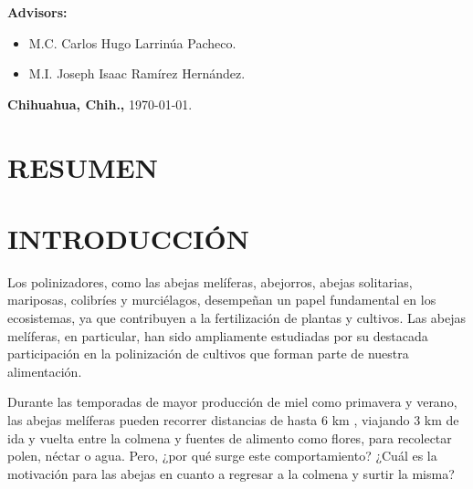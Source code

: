 \documentclass[12pt]{report}
\begin{document}
\begin{titlepage}
\begin{center}
			{\large \textbf{Advisors:}}\\[3.5ex]
			\begin{itemize}
				\item[\ding{226}] {\large M.C. Carlos Hugo Larrinúa Pacheco.}\\[3.5ex]
				\item[\ding{226}] {\large M.I. Joseph Isaac Ramírez Hernández.}\\[3.5ex]
			\end{itemize}
			\vfill
			{\large \textbf{Chihuahua, Chih.,} \today.}\\[3.5ex]
		\end{center}
	\end{titlepage}

\tableofcontents
\thispagestyle{empty} %


\pagebreak
\chapter*{RESUMEN}

\pagebreak
\chapter{INTRODUCCIÓN}

Los polinizadores, como las abejas melíferas, abejorros, abejas solitarias, mariposas, colibríes y murciélagos, desempeñan un papel fundamental en los ecosistemas, ya que contribuyen a la fertilización de plantas y cultivos. Las abejas melíferas, en particular, han sido ampliamente estudiadas por su destacada participación en la polinización de cultivos que forman parte de nuestra alimentación.

\par Durante las temporadas de mayor producción de miel como primavera y verano, las abejas melíferas pueden recorrer distancias de hasta 6 km \cite{Beekman2000}, viajando 3 km de ida y vuelta entre la colmena y fuentes de alimento como flores, para recolectar polen, néctar o agua. Pero, ¿por qué surge este comportamiento? ¿Cuál es la motivación para las abejas en cuanto a regresar a la colmena y surtir la misma?
\end{document}
